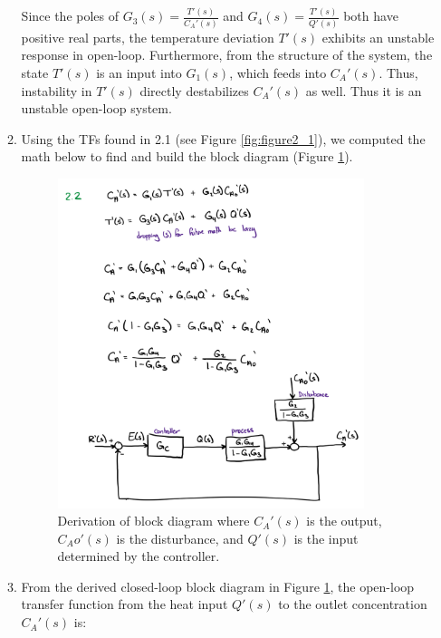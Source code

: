 \documentclass[12pt]{article}
\begin{document}
\begin{enumerate}
\begin{enumerate}
    Since the poles of \( G_3(s) = \frac{T'(s)}{C_A'(s)} \) and \( G_4(s) = \frac{T'(s)}{Q'(s)} \) both have positive real parts, the temperature deviation \( T'(s) \) exhibits an unstable response in open-loop. Furthermore, from the structure of the system, the state \( T'(s) \) is an input into \( G_1(s) \), which feeds into \( C_A'(s) \). Thus, instability in \( T'(s) \) directly destabilizes \( C_A'(s) \) as well. Thus it is an unstable open-loop system.
    
    \clearpage
    \item Using the TFs found in 2.1 (see Figure \ref{fig:figure2_1}), we computed the math below to find and build the block diagram (Figure \ref{fig:figure2_2}).
    
    \begin{figure}[H]
      \centering
      \includegraphics[width=0.9\textwidth]{Figures/figure2_2.png}
      \caption{Derivation of block diagram where \( C_A'(s) \) is the output, \( C_Ao'(s) \) is the disturbance, and \( Q'(s) \) is the input determined by the controller.}
      \label{fig:figure2_2}
    \end{figure}

    \item From the derived closed-loop block diagram in Figure \ref{fig:figure2_2}, the open-loop transfer function from the heat input \(Q'(s)\) to the outlet concentration \(C_A'(s)\) is:


\end{enumerate}
\end{enumerate}
\end{document}
